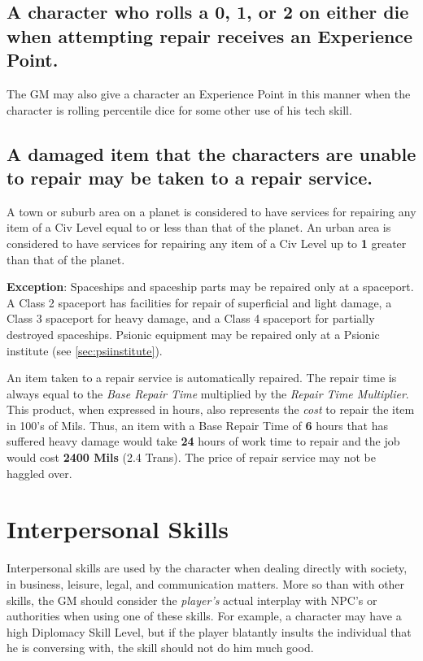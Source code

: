 \subsection[Experience Points]{A character who rolls a \textbf{0},
  \textbf{1}, or \textbf{2} on either die when attempting repair
  receives an Experience Point.}
\label{sec:tech-skills-ep}

The GM may also give a character an Experience Point in this manner
when the character is rolling percentile dice for some other use of
his tech skill.

\subsection[Repair Service]{A damaged item that the characters are
  unable to repair may be taken to a repair service.}
\label{sec:repair-service}

A town or suburb area on a planet is considered to have services for
repairing any item of a Civ Level equal to or less than that of the
planet.  An urban area is considered to have services for repairing any
item of a Civ Level up to \textbf{1} greater than that of the planet.

\textbf{Exception}: Spaceships and spaceship parts may be repaired
only at a spaceport.  A Class 2 spaceport has facilities for repair of
superficial and light damage, a Class 3 spaceport for heavy damage,
and a Class 4 spaceport for partially destroyed spaceships.  Psionic
equipment may be repaired only at a Psionic institute (see
\ref{sec:psiinstitute}).

An item taken to a repair service is automatically repaired.  The
repair time is always equal to the \emph{Base Repair Time} multiplied
by the \emph{Repair Time Multiplier}.  This product, when expressed in
hours, also represents the \emph{cost} to repair the item in 100's of Mils.
Thus, an item with a Base Repair Time of \textbf{6} hours that has
suffered heavy damage would take \textbf{24} hours of work time to
repair and the job would cost \textbf{2400 Mils} (2.4 Trans).
The price of repair service may not be haggled over.


\section{Interpersonal Skills}
\label{sec:interpersonal-skills}

Interpersonal skills are used by the character when dealing directly
with society, in business, leisure, legal, and communication matters.
More so than with other skills, the GM should consider the \emph{player's}
actual interplay with NPC's or authorities when using one of these
skills.  For example, a character may have a high Diplomacy Skill
Level, but if the player blatantly insults the individual that he is
conversing with, the skill should not do him much good.

